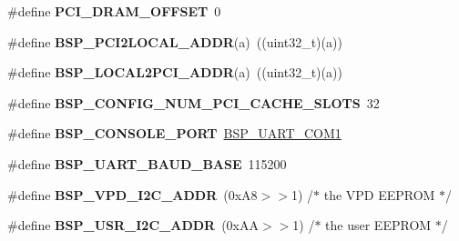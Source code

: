 \begin{DoxyCompactItemize}
\#define {\bfseries P\+C\+I\+\_\+\+D\+R\+A\+M\+\_\+\+O\+F\+F\+S\+ET}~0
\item 
\mbox{\label{group__RTEMSBSPsPowerPCBeatnik_gac18b8d4e93a82fb95dc0d83d82225c74}} 
\#define {\bfseries B\+S\+P\+\_\+\+P\+C\+I2\+L\+O\+C\+A\+L\+\_\+\+A\+D\+DR}(a)~((uint32\+\_\+t)(a))
\item 
\mbox{\label{group__RTEMSBSPsPowerPCBeatnik_gaec60d1672ce119058dc5c2c7d96033d8}} 
\#define {\bfseries B\+S\+P\+\_\+\+L\+O\+C\+A\+L2\+P\+C\+I\+\_\+\+A\+D\+DR}(a)~((uint32\+\_\+t)(a))
\item 
\mbox{\label{group__RTEMSBSPsPowerPCBeatnik_ga62ef647e4f1bb00d341e14683a510920}} 
\#define {\bfseries B\+S\+P\+\_\+\+C\+O\+N\+F\+I\+G\+\_\+\+N\+U\+M\+\_\+\+P\+C\+I\+\_\+\+C\+A\+C\+H\+E\+\_\+\+S\+L\+O\+TS}~32
\item 
\mbox{\label{group__RTEMSBSPsPowerPCBeatnik_ga2c88f414089ddba7b640655bcbeffc96}} 
\#define {\bfseries B\+S\+P\+\_\+\+C\+O\+N\+S\+O\+L\+E\+\_\+\+P\+O\+RT}~\mbox{\hyperlink{group__i386__uart_gaa1561064cc8499388f7512347b434d25}{B\+S\+P\+\_\+\+U\+A\+R\+T\+\_\+\+C\+O\+M1}}
\item 
\mbox{\label{group__RTEMSBSPsPowerPCBeatnik_ga4b41bd0ec37c1f8b14ced54ab3a8a6f7}} 
\#define {\bfseries B\+S\+P\+\_\+\+U\+A\+R\+T\+\_\+\+B\+A\+U\+D\+\_\+\+B\+A\+SE}~115200
\item 
\mbox{\label{group__RTEMSBSPsPowerPCBeatnik_ga465277ad03d2ee58789cf612e3d0cd65}} 
\#define {\bfseries B\+S\+P\+\_\+\+V\+P\+D\+\_\+\+I2\+C\+\_\+\+A\+D\+DR}~(0x\+A8$>$$>$1)    /$\ast$ the V\+P\+D E\+E\+P\+R\+O\+M  $\ast$/
\item 
\mbox{\label{group__RTEMSBSPsPowerPCBeatnik_ga8dc5279fa5721df6ca304964658a8e69}} 
\#define {\bfseries B\+S\+P\+\_\+\+U\+S\+R\+\_\+\+I2\+C\+\_\+\+A\+D\+DR}~(0x\+A\+A$>$$>$1)    /$\ast$ the user E\+E\+P\+R\+O\+M $\ast$/
\item 
\mbox{\label{group__RTEMSBSPsPowerPCBeatnik_ga4f40108c07dd771369ed40641b220b29}} 

\end{DoxyCompactItemize}
